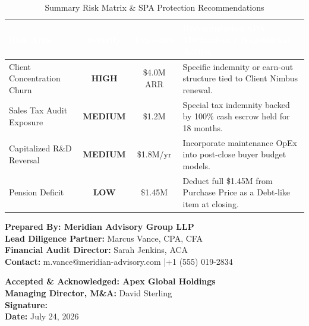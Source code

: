 \documentclass[10pt,a4paper,oneside]{scrreprt}
\newcommand{\tablehdr}[1]{\fontseries{b}\selectfont\textcolor{white}{#1}}
\begin{document}
\begin{table}[H]
\centering
\fontsize{8.2}{10}\selectfont
\renewcommand{\arraystretch}{1.02}
\begin{tabularx}{\textwidth}{L C C L}
\hline
{}
\tablehdr{Risk Area} & \tablehdr{Severity} & \tablehdr{Exposure} & \tablehdr{Recommended SPA Mechanism / Negotiation Action} \\
\hline
Client Concentration Churn & \textcolor{SoftRed}{\textbf{HIGH}} & \$4.0M ARR & Specific indemnity or earn-out structure tied to Client Nimbus renewal. \\
Sales Tax Audit Exposure & \textcolor{WarmAmber}{\textbf{MEDIUM}} & \$1.2M & Special tax indemnity backed by 100\% cash escrow held for 18 months. \\
Capitalized R\&D Reversal & \textcolor{WarmAmber}{\textbf{MEDIUM}} & \$1.8M/yr & Incorporate maintenance OpEx into post-close buyer budget models. \\
Pension Deficit & \textcolor{SoftGreen}{\textbf{LOW}} & \$1.45M & Deduct full \$1.45M from Purchase Price as a Debt-like item at closing. \\
\hline
\end{tabularx}
\caption{Summary Risk Matrix \& SPA Protection Recommendations}
\end{table}

\vspace{0.02cm}

\noindent
\begin{tcolorbox}[enhanced, colback=IceGray, colframe=NavyBlue, arc=3pt, boxrule=0.8pt, left=6pt, right=6pt, top=3pt, bottom=3pt]
  \begin{minipage}[t]{0.48\textwidth}
    \textbf{\textcolor{NavyBlue}{Prepared By: Meridian Advisory Group LLP}}\\[2pt]
    \small
    \textbf{Lead Diligence Partner:} Marcus Vance, CPA, CFA\\
    \textbf{Financial Audit Director:} Sarah Jenkins, ACA\\
    \textbf{Contact:} m.vance@meridian-advisory.com \quad|\quad +1 (555) 019-2834
  \end{minipage}\hfill
  \begin{minipage}[t]{0.48\textwidth}
    \textbf{\textcolor{NavyBlue}{Accepted \& Acknowledged: Apex Global Holdings}}\\[2pt]
    \small
    \textbf{Managing Director, M\&A:} David Sterling\\
    \textbf{Signature:} \underline{\hspace{4.5cm}}\\
    \textbf{Date:} July 24, 2026
  \end{minipage}
\end{tcolorbox}
\end{document}
